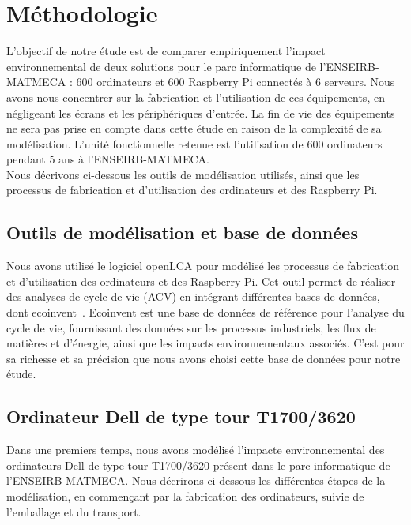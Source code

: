 \documentclass[12pt,a4paper]{paper}
\begin{document}

\section{Méthodologie}
L’objectif de notre étude est de comparer empiriquement l'impact environnemental de deux solutions pour le parc informatique de l'ENSEIRB-MATMECA : 600 ordinateurs et 600 Raspberry Pi connectés à 6 serveurs. Nous avons nous concentrer sur la fabrication et l'utilisation de ces équipements, en négligeant les écrans et les périphériques d'entrée. La fin de vie des équipements ne sera pas prise en compte dans cette étude en raison de la complexité de sa modélisation. L'unité fonctionnelle retenue est l'utilisation de 600 ordinateurs pendant 5 ans à l'ENSEIRB-MATMECA.\\
Nous décrivons ci-dessous les outils de modélisation utilisés, ainsi que les processus de fabrication et d'utilisation des ordinateurs et des Raspberry Pi. 

\subsection{Outils de modélisation et base de données}
Nous avons utilisé le logiciel openLCA pour modélisé les processus de fabrication et d'utilisation des ordinateurs et des Raspberry Pi. Cet outil permet de réaliser des analyses de cycle de vie (ACV) en intégrant différentes bases de données, dont ecoinvent~\cite{ecoinvent2024}. Ecoinvent est une base de données de référence pour l'analyse du cycle de vie, fournissant des données sur les processus industriels, les flux de matières et d'énergie, ainsi que les impacts environnementaux associés. C'est pour sa richesse et sa précision que nous avons choisi cette base de données pour notre étude.

\subsection{Ordinateur Dell de type tour T1700/3620}
Dans une premiers temps, nous avons modélisé l'impacte environnemental des ordinateurs Dell de type tour T1700/3620 présent dans le parc informatique de l'ENSEIRB-MATMECA. Nous décrirons ci-dessous les différentes étapes de la modélisation, en commençant par la fabrication des ordinateurs, suivie de l'emballage et du transport. 
\end{document}
